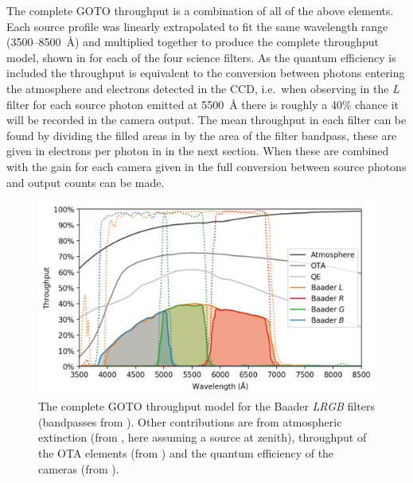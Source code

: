 \begin{colsection}
\begin{colsection}
The complete GOTO throughput is a combination of all of the above elements. Each source profile was linearly extrapolated to fit the same wavelength range (3500--\SI{8500}{\angstrom}) and multiplied together to produce the complete throughput model, shown in  for each of the four science filters. As the quantum efficiency is included the throughput is equivalent to the conversion between photons entering the atmosphere and electrons detected in the CCD, i.e.\ when observing in the \textit{L} filter for each source photon emitted at \SI{5500}{\angstrom} there is roughly a 40\% chance it will be recorded in the camera output. The mean throughput in each filter can be found by dividing the filled areas in  by the area of the filter bandpass, these are given in electrons per photon in  in the next section. When these are combined with the gain for each camera given in  the full conversion between source photons and output counts can be made.

\begin{figure}[t]
    \begin{center}
        \includegraphics[width=\textwidth]{images/throughput/throughput.png}
    \end{center}
    \caption[Complete throughput model for the GOTO filters]{
        The complete GOTO throughput model for the Baader \textit{LRGB} filters (bandpasses from ). Other contributions are from atmospheric extinction (from , here assuming a source at zenith), throughput of the OTA elements (from ) and the quantum efficiency of the cameras (from ).
    }\label{fig:throughput}
\end{figure}

\end{colsection}


\end{colsection}

